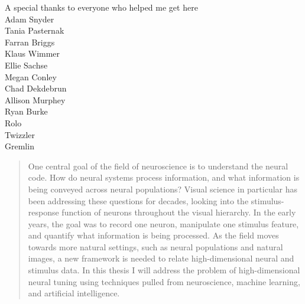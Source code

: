 \documentclass[
11pt, %
english, %
doublespacing, %
nolistspacing, %
headsepline, %
]{MastersDoctoralThesis} %
\begin{document}
\begin{acknowledgements}
	A special thanks to everyone who helped me get here\\
	Adam Snyder \\
	Tania Pasternak \\
	Farran Briggs \\
	Klaus Wimmer \\
	Ellie Sachse \\
	Megan Conley \\
	Chad Dekdebrun \\
	Allison Murphey \\
	Ryan Burke \\
	Rolo \\
	Twizzler \\
	Gremlin \\
\end{acknowledgements}



\begin{abstract}
	\addchaptertocentry{\color{thesisBlue} \abstractname} %
	One central goal of the field of neuroscience is to understand the neural code. How do neural systems process information, and what information is being conveyed across neural populations? Visual science in particular has been addressing these questions for decades, looking into the stimulus-response function of neurons throughout the visual hierarchy. In the early years, the goal was to record one neuron, manipulate one stimulus feature, and quantify what information is being processed. As the field moves towards more natural settings, such as neural populations and natural images, a new framework is needed to relate high-dimensional neural and stimulus data. In this thesis I will address the problem of high-dimensional neural tuning using techniques pulled from neuroscience, machine learning, and artificial intelligence.
\end{abstract}

\addchaptertocentry{\color{thesisBlue}}
\end{document}
